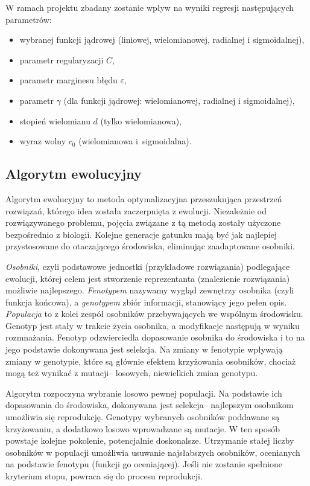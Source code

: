 W ramach projektu zbadany zostanie wpływ na wyniki regresji następujących parametrów:
\begin{itemize}
    \item wybranej funkcji jądrowej (liniowej, wielomianowej, radialnej i sigmoidalnej),
    \item parametr regularyzacji $C$,
    \item parametr marginesu błędu $\varepsilon$,
    \item parametr $\gamma$ (dla funkcji jądrowej: wielomianowej, radialnej i sigmoidalnej),
    \item stopień wielomianu $d$ (tylko wielomianowa),
    \item wyraz wolny $c_{0}$ (wielomianowa i~sigmoidalna).
\end{itemize}

\subsection{Algorytm ewolucyjny}
\label{subsec:evolution}
Algorytm ewolucyjny to metoda optymalizacyjna przeszukująca przestrzeń rozwiązań, którego idea została zaczerpnięta z ewolucji. Niezależnie od rozwiązywanego problemu, pojęcia związane z tą metodą zostały użyczone bezpośrednio z biologii. Kolejne generacje gatunku mają być jak najlepiej przystosowane do otaczającego środowiska, eliminując zaadaptowane osobniki. 

\textit{Osobniki}, czyli podstawowe jednostki (przykładowe rozwiązania) podlegające ewolucji, której celem jest stworzenie reprezentanta (znalezienie rozwiązania) możliwie najlepszego. \textit{Fenotypem} nazywamy wygląd zewnętrzy osobnika (czyli funkcja końcowa), a \textit{genotypem} zbiór informacji, stanowiący jego pełen opis. \textit{Populacja} to z kolei zespół osobników przebywających we wspólnym
środowisku. Genotyp jest stały w trakcie życia osobnika, a modyfikacje następują w wyniku rozmnażania. Fenotyp odzwierciedla dopasowanie osobnika do środowiska i to na jego podstawie dokonywana jest selekcja. Na zmiany w fenotypie wpływają zmiany w genotypie, które są głównie efektem krzyżowania osobników, chociaż mogą też wynikać z mutacji-- losowych, niewielkich zmian genotypu.

Algorytm rozpoczyna wybranie losowo pewnej populacji. Na podstawie ich dopasowania do środowiska, dokonywana jest selekcja-- najlepszym osobnikom umożliwia się reprodukcję. Genotypy wybranych osobników poddawane są krzyżowaniu, a dodatkowo losowo wprowadzane są mutacje. W ten sposób powstaje kolejne pokolenie, potencjalnie doskonalsze. Utrzymanie stałej liczby osobników w populacji umożliwia usuwanie najsłabszych osobników, ocenianych na podstawie fenotypu (funkcji go oceniającej). Jeśli nie zostanie spełnione kryterium stopu, powraca się do procesu reprodukcji.

